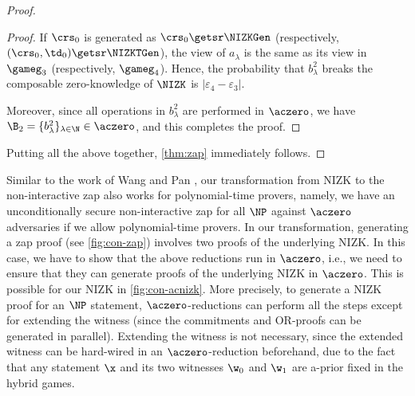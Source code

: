 \begin{proof}
\begin{proof}
If $\crs_0$ is generated as $\crs_0\getsr\NIZKGen$ (respectively, $(\crs_0,\td_0)\getsr\NIZKTGen$), the view of $a_\lambda$ is the same as its view in $\gameg_3$ (respectively, $\gameg_4$). Hence, the probability that $b_\lambda^2$ breaks the composable zero-knowledge of $\NIZK$ is
$|\varepsilon_4-\varepsilon_3|$.

Moreover, since all operations in $b_\lambda^2$ are performed in $\aczero$, we have $\B_2 = \{b_{\lambda}^2\}_{\lambda\in\N} \in \aczero$, and this completes the proof.
\end{proof}


Putting all the above together, \cref{thm:zap} immediately follows.
\end{proof}

Similar to the work of Wang and Pan \cite{EC:WanPan22},
our transformation from NIZK to the non-interactive zap also works for polynomial-time provers, namely, we have an unconditionally secure non-interactive zap for all $\NP$ against $\aczero$ adversaries if we allow polynomial-time provers. In our transformation, generating a zap proof (see \cref{fig:con-zap}) involves two proofs of the underlying NIZK. In this case, we have to show that the above reductions run in $\aczero$, i.e., we need to ensure that they can generate proofs of the underlying NIZK in $\aczero$. This is possible for our NIZK in \cref{fig:con-acnizk}. More precisely, to generate a NIZK proof for an $\NP$ statement, $\aczero$-reductions can perform all the steps except for extending the witness (since the commitments and OR-proofs can be generated in parallel). Extending the witness is not necessary, since the extended witness can be hard-wired in an $\aczero$-reduction beforehand, due to the fact that any statement $\x$ and its two witnesses $\w_0$ and $\w_1$ are a-prior fixed in the hybrid games.

